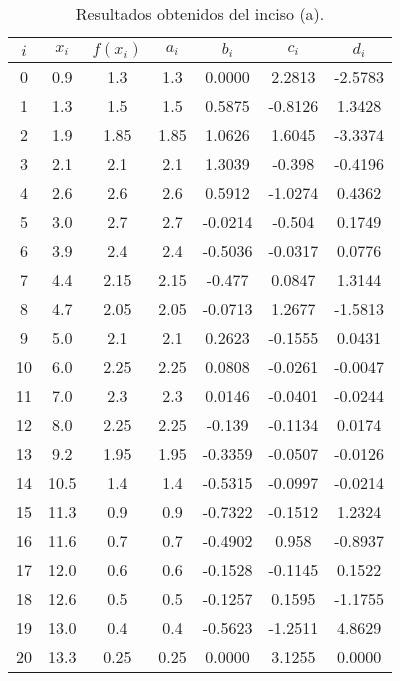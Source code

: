\documentclass[10pt,a4paper]{article}
\begin{document}
\begin{table}[h]
\centering
\begin{tabular}{ | c | c | c | c | c | c | c | }
\hline
$i$ & $x_i$ & $f(x_i)$ & $a_i$ & $b_i$ & $c_i$ & $d_i$ \\
  \hline
0	&0.9	&1.3	&1.3	&0.0000	&2.2813	&-2.5783\\
1	&1.3	&1.5	&1.5	&0.5875	&-0.8126	&1.3428\\
2	&1.9	&1.85	&1.85	&1.0626	&1.6045	&-3.3374\\
3	&2.1	&2.1	&2.1	&1.3039	&-0.398	&-0.4196\\
4	&2.6	&2.6	&2.6	&0.5912	&-1.0274	&0.4362\\
5	&3.0	&2.7	&2.7	&-0.0214	&-0.504	&0.1749\\	
6	&3.9	&2.4	&2.4	&-0.5036	&-0.0317	&0.0776\\
7	&4.4	&2.15	&2.15	&-0.477	&0.0847	&1.3144\\
8	&4.7	&2.05	&2.05	&-0.0713	&1.2677	&-1.5813\\
9	&5.0	&2.1	&2.1	&0.2623	&-0.1555	&0.0431\\
10	&6.0	&2.25	&2.25	&0.0808	&-0.0261	&-0.0047\\
11	&7.0	&2.3	&2.3	&0.0146	&-0.0401	&-0.0244\\
12	&8.0	&2.25	&2.25	&-0.139	&-0.1134	&0.0174\\
13	&9.2	&1.95	&1.95	&-0.3359	&-0.0507	&-0.0126\\
14	&10.5	&1.4	&1.4	&-0.5315	&-0.0997	&-0.0214\\
15	&11.3	&0.9	&0.9	&-0.7322	&-0.1512	&1.2324\\
16	&11.6	&0.7	&0.7	&-0.4902	&0.958	&-0.8937\\
17	&12.0	&0.6	&0.6	&-0.1528	&-0.1145	&0.1522\\
18	&12.6	&0.5	&0.5	&-0.1257	&0.1595	&-1.1755\\
19	&13.0	&0.4	&0.4	&-0.5623	&-1.2511	&4.8629\\
20	&13.3	&0.25	&0.25	&0.0000	&3.1255	&0.0000\\
\hline
\end{tabular}
\caption{Resultados obtenidos del inciso (a).}
\label{tab:myfirsttable}
\end{table}
\end{document}
